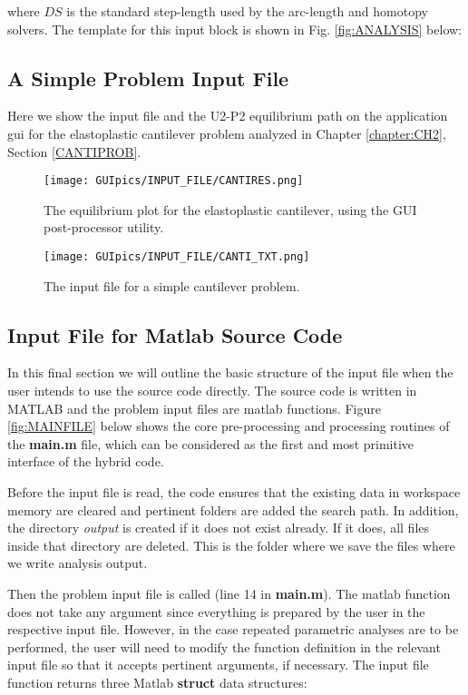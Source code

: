 \begin{appendices}
\noindent where $DS$ is the standard step-length used by the arc-length and 
homotopy solvers. The template for this input block is shown in Fig. 
\ref{fig:ANALYSIS} below:

\subsection*{A Simple Problem Input File}

Here we show the input file and the U2-P2 equilibrium path on the application 
\acrshort{gui} for the elastoplastic cantilever problem analyzed in Chapter 
\ref{chapter:CH2}, Section \ref{CANTIPROB}.
\begin{figure}
	\centering
	\texttt{[image: GUIpics/INPUT\_FILE/CANTIRES.png]}
	\caption{The equilibrium plot for the elastoplastic cantilever, using the 
		GUI post-processor utility.}
	\label{fig:RES}
\end{figure}

\begin{figure}
	\centering
	\texttt{[image: GUIpics/INPUT\_FILE/CANTI\_TXT.png]}
	\caption{The input file for a simple cantilever problem.}
	\label{fig:CANTINPUT}
\end{figure}

\subsection*{Input File for Matlab Source Code}

In this final section we will outline the basic structure of the input file 
when the user intends to use the source code directly. The source code is 
written in MATLAB and the problem input files are matlab functions. Figure 
\ref{fig:MAINFILE} below shows the core pre-processing and processing routines 
of the \textbf{main.m} file, which can be considered as the first and most 
primitive interface of the hybrid code.

Before the input file is read, the code ensures that the existing data in 
workspace memory are cleared and pertinent folders are added the search path. 
In addition, the directory \textit{output} is created if it does not exist 
already. If it does, all files inside that directory are deleted. This is the 
folder where we save the files where we write analysis output.

Then the problem input file is called (line 14 in \textbf{main.m}). The matlab 
function does not take any argument since everything is prepared by the user in 
the respective input file. However, in the case repeated parametric analyses 
are to be performed, the user will need to modify the function definition in 
the relevant input file so that it accepts pertinent arguments, if necessary. 
The input file function returns three Matlab \textbf{struct} data structures:


\end{appendices}
